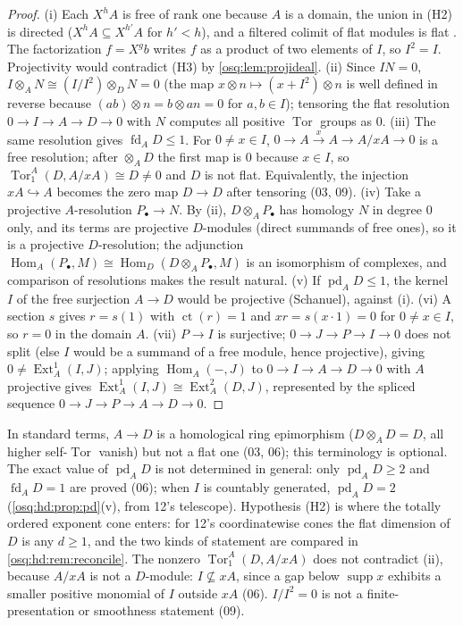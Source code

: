 \documentclass[11pt,letterpaper]{article}
\numberwithin{equation}{section}
\theoremstyle{definition}
\theoremstyle{remark}
\theoremstyle{plain}
\newcommand{\ct}{\operatorname{ct}}
\newcommand{\supp}{\operatorname{supp}}
\newcommand{\Hom}{\operatorname{Hom}}
\newcommand{\Tor}{\operatorname{Tor}}
\newcommand{\Ext}{\operatorname{Ext}}
\newcommand{\pd}{\operatorname{pd}}
\newcommand{\fd}{\operatorname{fd}}
\begin{document}
\begin{proof}
(i) Each $X^hA$ is free of rank one because $A$ is a domain, the union in (H2) is directed
($X^hA\subseteq X^{h'}A$ for $h'<h$), and a filtered colimit of flat modules is flat
\cite[Lemma~10.39.3]{StacksFlat}. The factorization $f=X^gb$ writes $f$ as a product of two elements
of $I$, so $I^2=I$. Projectivity would contradict (H3) by \cref{osq:lem:projideal}.
(ii) Since $IN=0$, $I\otimes_AN\cong(I/I^2)\otimes_DN=0$ (the map $x\otimes n\mapsto(x+I^2)\otimes n$ is
well defined in reverse because $(ab)\otimes n=b\otimes an=0$ for $a,b\in I$); tensoring the flat
resolution $0\to I\to A\to D\to0$ with $N$ computes all positive $\Tor$ groups as $0$.
(iii) The same resolution gives $\fd_AD\le1$. For $0\ne x\in I$, $0\to A\xrightarrow{x}A\to A/xA\to0$ is a
free resolution; after $\otimes_AD$ the first map is $0$ because $x\in I$, so $\Tor_1^A(D,A/xA)\cong D\ne0$
and $D$ is not flat. Equivalently, the injection $xA\hookrightarrow A$ becomes the zero map $D\to D$ after
tensoring (03, 09).
(iv) Take a projective $A$-resolution $P_\bullet\to N$. By (ii), $D\otimes_AP_\bullet$ has homology $N$ in
degree $0$ only, and its terms are projective $D$-modules (direct summands of free ones), so it is a
projective $D$-resolution; the adjunction $\Hom_A(P_\bullet,M)\cong\Hom_D(D\otimes_AP_\bullet,M)$ is an
isomorphism of complexes, and comparison of resolutions makes the result natural.
(v) If $\pd_AD\le1$, the kernel $I$ of the free surjection $A\to D$ would be projective (Schanuel), against
(i).
(vi) A section $s$ gives $r=s(1)$ with $\ct(r)=1$ and $xr=s(x\cdot1)=0$ for $0\ne x\in I$, so $r=0$ in the
domain $A$.
(vii) $P\to I$ is surjective; $0\to J\to P\to I\to0$ does not split (else $I$ would be a summand of a free
module, hence projective), giving $0\ne\Ext^1_A(I,J)$; applying $\Hom_A(-,J)$ to
$0\to I\to A\to D\to0$ with $A$ projective gives $\Ext^1_A(I,J)\cong\Ext^2_A(D,J)$, represented by the
spliced sequence $0\to J\to P\to A\to D\to0$.
\end{proof}

In standard terms, $A\to D$ is a homological ring epimorphism ($D\otimes_AD=D$, all higher self-$\Tor$
vanish) but not a flat one (03, 06); this terminology is optional. The exact value of $\pd_AD$ is not
determined in general: only $\pd_AD\ge2$ and $\fd_AD=1$ are proved (06); when $I$ is countably generated,
$\pd_AD=2$ (\cref{osq:hd:prop:pd}(v), from 12's telescope). Hypothesis (H2) is where the totally ordered exponent
cone enters: for 12's coordinatewise cones the flat dimension of $D$ is any $d\ge1$, and the two kinds of
statement are compared in \cref{osq:hd:rem:reconcile}. The nonzero $\Tor_1^A(D,A/xA)$ does not
contradict (ii), because $A/xA$ is not a $D$-module: $I\not\subseteq xA$, since a gap below $\supp x$
exhibits a smaller positive monomial of $I$ outside $xA$ (06). $I/I^2=0$ is not a finite-presentation or
smoothness statement (09).
\end{document}
